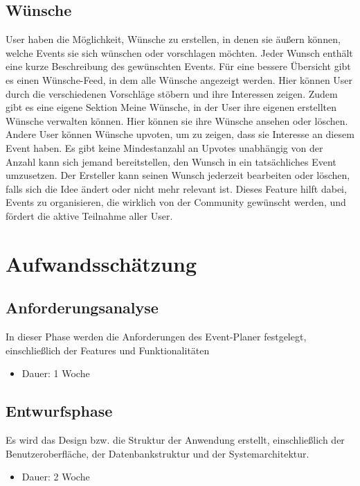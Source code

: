 \documentclass[a4paper,12pt]{article}
\begin{document}
\subsection{Wünsche}
User haben die Möglichkeit, Wünsche zu erstellen, in denen sie äußern können, welche Events sie sich wünschen oder vorschlagen möchten. Jeder Wunsch enthält eine kurze Beschreibung des gewünschten Events. Für eine bessere Übersicht gibt es einen Wünsche-Feed, in dem alle Wünsche angezeigt werden. Hier können User durch die verschiedenen Vorschläge stöbern und ihre Interessen zeigen. Zudem gibt es eine eigene Sektion Meine Wünsche, in der User ihre eigenen erstellten Wünsche verwalten können. Hier können sie ihre Wünsche ansehen oder löschen. Andere User können Wünsche upvoten, um zu zeigen, dass sie Interesse an diesem Event haben. Es gibt keine Mindestanzahl an Upvotes unabhängig von der Anzahl kann sich jemand bereitstellen, den Wunsch in ein tatsächliches Event umzusetzen. Der Ersteller kann seinen Wunsch jederzeit bearbeiten oder löschen, falls sich die Idee ändert oder nicht mehr relevant ist. Dieses Feature hilft dabei, Events zu organisieren, die wirklich von der Community gewünscht werden, und fördert die aktive Teilnahme aller User.

\newpage


\section{Aufwandsschätzung}


\subsection{Anforderungsanalyse}
In dieser Phase werden die Anforderungen des Event-Planer festgelegt, einschließlich der Features und Funktionalitäten
\begin{itemize}
    \item Dauer: 1 Woche
\end{itemize}


\subsection{Entwurfsphase}
Es wird das Design bzw. die Struktur der Anwendung erstellt, einschließlich der Benutzeroberfläche, der Datenbankstruktur und der Systemarchitektur.
\begin{itemize}
    \item Dauer: 2 Woche
\end{itemize}
\end{document}
